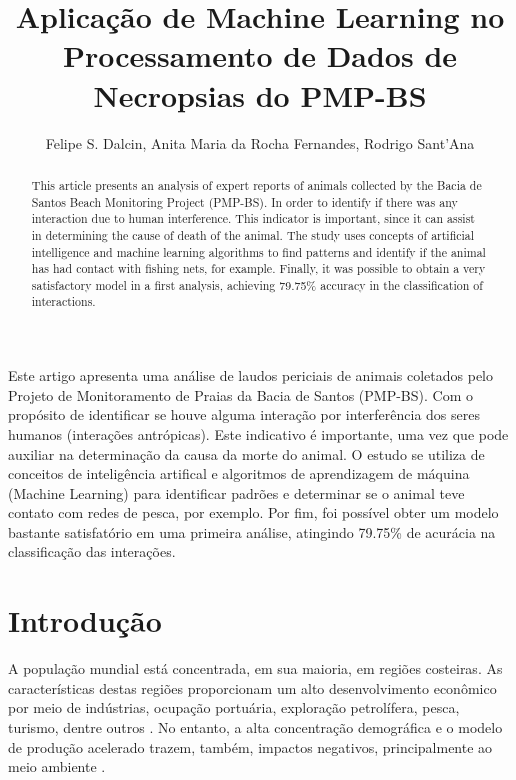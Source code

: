 \documentclass[12pt]{article}
\title{Aplicação de Machine Learning no Processamento de Dados de Necropsias do PMP-BS}
\author{Felipe S. Dalcin\inst{1}, Anita Maria da Rocha Fernandes\inst{1}, Rodrigo Sant'Ana\inst{1}}
\begin{document}
 

\maketitle

\begin{abstract}

This article presents an analysis of expert reports of animals collected by the Bacia de Santos Beach Monitoring Project (PMP-BS). In order to identify if there was any interaction due to human interference. This indicator is important, since it can assist in determining the cause of death of the animal. The study uses concepts of artificial intelligence and machine learning algorithms to find patterns and identify if the animal has had contact with fishing nets, for example. Finally, it was possible to obtain a very satisfactory model in a first analysis, achieving 79.75\% accuracy in the classification of interactions.

\end{abstract}
     
\begin{resumo} 

Este artigo apresenta uma análise de laudos periciais de animais coletados pelo Projeto de Monitoramento de Praias da Bacia de Santos (PMP-BS). Com o propósito de identificar se houve alguma interação por interferência dos seres humanos (interações antrópicas). Este indicativo é importante, uma vez que pode auxiliar na determinação da causa da morte do animal. O estudo se utiliza de conceitos de inteligência artifical e algoritmos de aprendizagem de máquina (Machine Learning) para identificar padrões e determinar se o animal teve contato com redes de pesca, por exemplo. Por fim, foi possível obter um modelo bastante satisfatório em uma primeira análise, atingindo 79.75\% de acurácia na classificação das interações.

\end{resumo}

\section{Introdução}

A população mundial está concentrada, em sua maioria, em regiões costeiras. As características destas regiões proporcionam um alto desenvolvimento econômico por meio de indústrias, ocupação portuária, exploração petrolífera, pesca, turismo, dentre outros \cite{mma:zcmu}. No entanto, a alta concentração demográfica e o modelo de produção acelerado trazem, também, impactos negativos, principalmente ao meio ambiente \cite{mma:zcmu, mma:pngc}.
\end{document}
